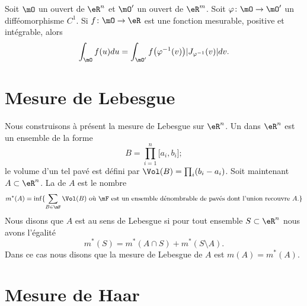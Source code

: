 \begin{theorem} \label{ThomFeRCi}
    Soit \( \mO\) un ouvert de \( \eR^n\) et \( \mO'\) un ouvert de \( \eR^m\). Soit \( \varphi\colon \mO\to \mO'\) un difféomorphisme \( C^1\). Si \( f\colon \mO\to \eR\) est une fonction mesurable, positive et intégrable, alors
    \begin{equation}
        \int_{\mO}f(u)du=\int_{\mO'}f\big( \varphi^{-1}(v) \big)| J_{\varphi^{-1}}(v) |dv.
    \end{equation}
\end{theorem}

\section{Mesure de Lebesgue}

Nous construisons à présent la mesure de Lebesgue sur \( \eR^n\). Un  dans \( \eR^n\) est un ensemble de la forme 
\begin{equation}
    B=\prod_{i=1}^n\mathopen[ a_i , b_i \mathclose];
\end{equation}
le volume d'un tel pavé est défini par \( \Vol(B)=\prod_i(b_i-a_i)\). Soit maintenant \( A\subset \eR^n\). La  de \( A\) est le nombre
\begin{equation}
    m^*(A)=\inf\{ \sum_{B\in\mF}\Vol(B)\text{ où \( \mF\) est un ensemble dénombrable de pavés dont l'union recouvre \( A\).} \}
\end{equation}
Nous disons que \( A\) est  au sens de Lebesgue si pour tout ensemble \( S\subset \eR^n\) nous avons l'égalité
\begin{equation}
    m^*(S)=m^*(A\cap S)+m^*(S\setminus A).
\end{equation}
Dans ce cas nous disons que la mesure de Lebesgue de \( A\) est \( m(A)=m^*(A)\).

\section{Mesure de Haar}


